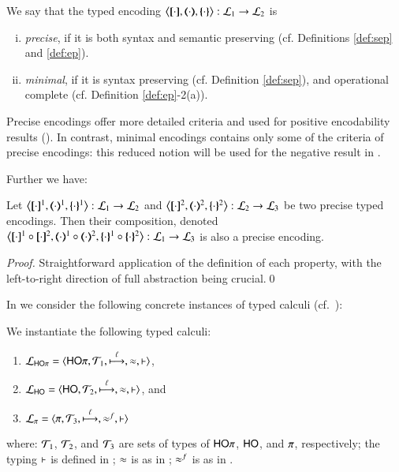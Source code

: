 \begin{definition}\rm
	\label{def:goodenc}
	We say that  the typed encoding 
	$\enco{\map{\cdot}, \mapt{\cdot}, \mapa{\cdot}}: \tyl{L}_1 \to \tyl{L}_2$ is 
%
	\begin{enumerate}[(i)]
		\item	\emph{precise}, if it is both syntax and semantic preserving
			(cf. Definitions \ref{def:sep} and  \ref{def:ep}).

		\item	\emph{minimal}, if it is syntax preserving 
			(cf. Definition \ref{def:sep}),
			and operational complete (cf. Definition \ref{def:ep}-2(a)).
	\end{enumerate}
\end{definition}

Precise encodings offer more detailed criteria and used for positive 
encodability results ().
In contrast, minimal encodings contains only 
some of the criteria of precise encodings:    
this reduced notion will be used 
for the negative result in . 

Further we have:
\begin{proposition}\rm
	\label{prop:enc_composability}
	Let %
	$\enco{\map{\cdot}^{1}, \mapt{\cdot}^{1}, \mapa{\cdot}^{1}}: \tyl{L}_1 \to \tyl{L}_2$
	and 
	$\enco{\map{\cdot}^{2}, \mapt{\cdot}^{2}, \mapa{\cdot}^{2}}: \tyl{L}_2 \to \tyl{L}_3$
	be two precise typed encodings.
	Then their composition, denoted 
	$\enco{\map{\cdot}^{1} \circ \map{\cdot}^{2}, \mapt{\cdot}^{1} \circ \mapt{\cdot}^{2}, \mapa{\cdot}^{1}\circ \mapa{\cdot}^{2}}: \tyl{L}_1 \to \tyl{L}_3$
	is also a precise encoding.
\end{proposition}

\begin{proof}
	Straightforward application of the definition of each property, with the left-to-right direction of
	full abstraction being crucial.\qed
\end{proof}

In  %
we consider the following concrete instances of typed calculi
(cf.~):


\begin{definition}\rm
	We instantiate the following typed calculi:
%
	\begin{enumerate}[1.]
		\item	$\mathcal{L}_{\mathsf{HO}\pi}=\langle \mathsf{HO}\pi, {\cal{T}}_1, \stackrel{\ell}{\longmapsto}, \approx, \vdash \rangle$,
		\item	$\mathcal{L}_{\mathsf{HO}}=\langle \mathsf{HO}, {\cal{T}}_2, \stackrel{\ell}{\longmapsto}, \approx, \vdash \rangle$, and
		\item	$\mathcal{L}_{\pi}=\langle \pi, {\cal{T}}_3, \stackrel{\ell}{\longmapsto}, \approx^{f}, \vdash \rangle$ 
	\end{enumerate}
%
	where: 
	${\cal{T}}_1$, ${\cal{T}}_2$, 
	and ${\cal{T}}_3$
	are sets of types of $\mathsf{HO}\pi$, $\mathsf{HO}$, and $\pi$, respectively;
	the typing $\vdash$ is defined in 
	;  
	$\approx$ is as in ; 
	$\approx^{f}$ is as in .
\end{definition}


